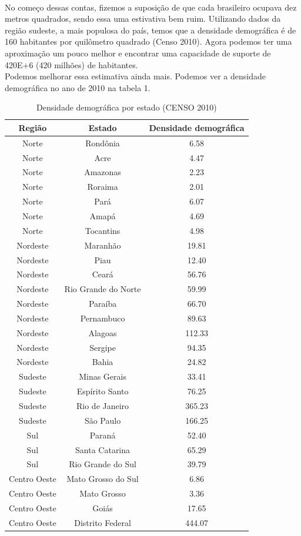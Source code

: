 \documentclass[a4paper]{article}
\begin{document}
\\
No come\c{c}o dessas contas, fizemos a suposi\c{c}\~{a}o de que cada brasileiro ocupava dez metros quadrados, sendo essa uma estivativa bem ruim. Utilizando dados da regi\~{a}o sudeste, a mais populosa do pa\'{i}s, temos que a densidade demogr\'{a}fica \'{e} de 160 habitantes por quil\^{o}metro quadrado (Censo 2010). Agora podemos ter uma aproxima\c{c}\~{a}o um pouco melhor e encontrar uma capacidade de suporte de 420E+6 (420 milh\~{o}es) de habitantes.
\\
Podemos melhorar essa estimativa ainda mais. Podemos ver a densidade demogr\'{a}fica no ano de 2010 na tabela 1.
\\
\begin{table}[ht!]
\centering
\caption{Densidade demogr\'{a}fica por estado (CENSO 2010)}
\label{tabelaCensoDem2010}
\begin{tabular}{c|c|c}
Regi\~{a}o		&	Estado				&	Densidade demogr\'{a}fica\\
\hline
Norte		&	Rond\^{o}nia		& 	6.58		\\
Norte		&	Acre			&	4.47		\\
Norte		&	Amazonas 		&	2.23		\\
Norte		&	Roraima			&	2.01		\\
Norte		&	Par\'{a} 		&	6.07		\\
Norte		&	Amap\'{a}		&	4.69		\\
Norte		&	Tocantins		&	4.98		\\
Nordeste	&	Maranh\~{a}o 		&	19.81 		\\
Nordeste	&	Piau			&	12.40		\\
Nordeste	&	Cear\'{a}		&	56.76 		\\
Nordeste	&	Rio Grande do Norte	&	59.99 		\\
Nordeste	&	Para\'{i}ba		&	66.70 		\\
Nordeste	&	Pernambuco		&	89.63 		\\
Nordeste	&	Alagoas			&	112.33		\\
Nordeste	&	Sergipe			&	94.35		\\
Nordeste	&	Bahia			&	24.82		\\
Sudeste		&	Minas Gerais		&	33.41 		\\
Sudeste		&	Esp\'{i}rito Santo	&	76.25 		\\
Sudeste		&	Rio de Janeiro		&	365.23  	\\
Sudeste		&	S\~{a}o Paulo		&	166.25  	\\
Sul		&	Paran\'{a}		&	52.40		\\
Sul		&	Santa Catarina		&	65.29		\\
Sul		&	Rio Grande do Sul	&	39.79		\\	
Centro Oeste	& 	Mato Grosso do Sul	&	6.86   		\\
Centro Oeste	& 	Mato Grosso		&	3.36   		\\
Centro Oeste	& 	Goi\'{a}s		&	17.65  		\\
Centro Oeste	& 	Distrito Federal	&	444.07	
\end{tabular}
\end{table}
\end{document}
